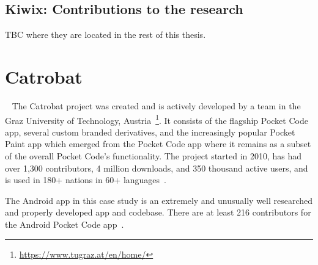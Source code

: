 \subsection{Kiwix: Contributions to the research}
TBC where they are located in the rest of this thesis.


\clearpage


\section{Catrobat}~\label{case-study-overview-catrobat}
The Catrobat project was created and is actively developed by a team in the Graz University of Technology, Austria~\footnote{\url{https://www.tugraz.at/en/home/}}. It consists of the flagship Pocket Code app, several custom branded derivatives, and the increasingly popular Pocket Paint app which emerged from the Pocket Code app where it remains as a subset of the overall Pocket Code's functionality. The project started in 2010, has had over 1,300 contributors, 4 million downloads, and 350 thousand active users, and is used in 180+ nations in 60+ languages~.

The Android app in this case study is an extremely and unusually well researched and properly developed app and codebase.  There are at least 216 contributors for the Android Pocket Code app~.

